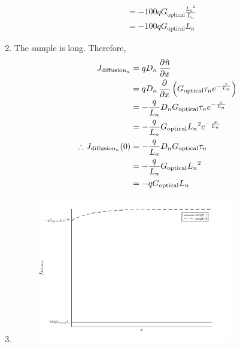 \documentclass[fleqn, a4paper, 11pt, oneside]{amsart}
\theoremstyle{definition}
\theoremstyle{theorem}
\begin{document}
\begin{solution}
\begin{enumerate}[leftmargin=*]
\begin{align*}
                                                       & = -100 q G_{\text{optical}} \frac{{L_n}^2}{L_n}    \\
                                                       & = -100 q G_{\text{optical}} L_n
			\end{align*}
		\item
			The sample is long.
			Therefore,
			\begin{align*}
				J_{\text{diffusion}_n}               & = q D_n \dpd{\hat{n}}{x}                                                     \\
                                                                     & = q D_n \dpd{}{x}\left( G_{\text{optical}} \tau_n e^{-\frac{x}{L_n}} \right) \\
                                                                     & = -\frac{q}{L_n} D_n G_{\text{optical}} \tau_n e^{-\frac{x}{L_n}}            \\
                                                                     & = -\frac{q}{L_n} G_{\text{optical}} {L_n}^2 e^{-\frac{x}{L_n}}               \\
				\therefore J_{\text{diffusion}_n}(0) & = -\frac{q}{L_n} D_n G_{\text{optical}} \tau_n                               \\
                                                                     & = -\frac{q}{L_n} G_{\text{optical}} {L_n}^2                                  \\
                                                                     & = -q G_{\text{optical}} L_n
			\end{align*}
		\item
			\begin{figure}[H]
				\centering
				\includegraphics[width = 0.8\textwidth]{plot2.pdf}
			\end{figure}
	\end{enumerate}
\end{solution}
\end{document}
